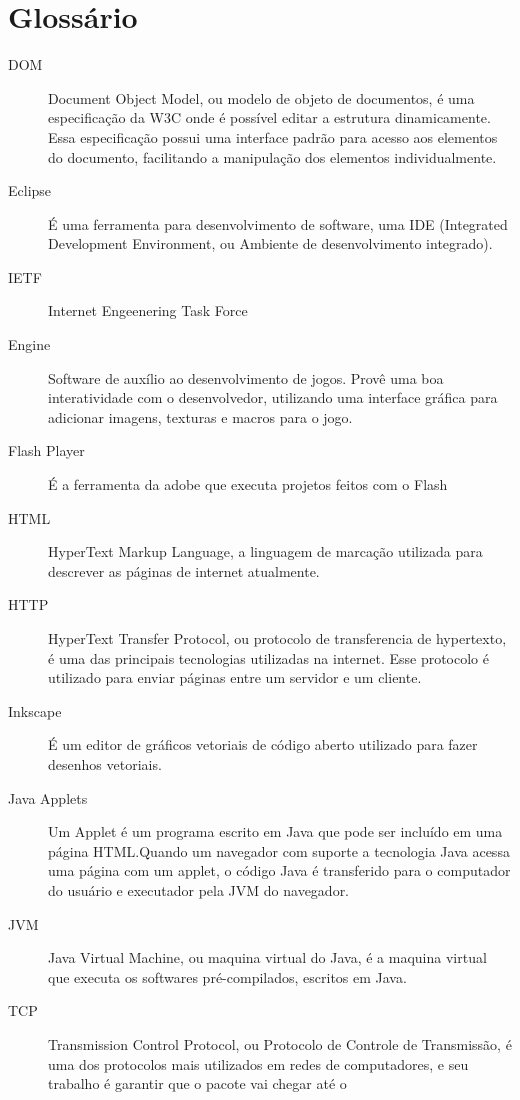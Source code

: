 
\section*{Glossário}

\begin{description}
\item[DOM ] Document Object Model, ou modelo de objeto de documentos,
é uma especificação da W3C onde é possível editar a estrutura
dinamicamente. Essa especificação possui uma interface padrão para
acesso aos elementos do documento, facilitando a manipulação dos
elementos individualmente.
\item[Eclipse ] É uma ferramenta para desenvolvimento de software, uma
IDE (Integrated Development Environment, ou Ambiente de
desenvolvimento integrado).
\item[IETF ] Internet Engeenering Task Force
\item[Engine ] Software de auxílio ao desenvolvimento de jogos. Provê
uma boa interatividade com o desenvolvedor, utilizando uma interface
gráfica para adicionar imagens, texturas e macros para o jogo.
\item[Flash Player ] É a ferramenta da adobe que executa projetos
feitos com o Flash
\item[HTML ] HyperText Markup Language, a linguagem de marcação
utilizada para descrever as páginas de internet atualmente.
\item[HTTP ] HyperText Transfer Protocol, ou protocolo de
transferencia de hypertexto, é uma das principais tecnologias
utilizadas na internet. Esse protocolo é utilizado para enviar páginas
entre um servidor e um cliente.
\item[Inkscape ] É um editor de gráficos vetoriais de código aberto
utilizado para fazer desenhos vetoriais.
\item[Java Applets ] Um Applet é um programa escrito em Java que pode
ser incluído em uma página HTML.Quando um navegador com suporte a
tecnologia Java acessa uma página com um applet, o código Java é
transferido para o computador do usuário e executador pela JVM do
navegador.
\item[JVM ] Java Virtual Machine, ou maquina virtual do Java, é a
maquina virtual que executa os softwares pré-compilados, escritos em
Java.
\item[TCP ] Transmission Control Protocol, ou Protocolo de Controle de
Transmissão, é uma dos protocolos mais utilizados em redes de
computadores, e seu trabalho é garantir que o pacote vai chegar até o

\end{description}
